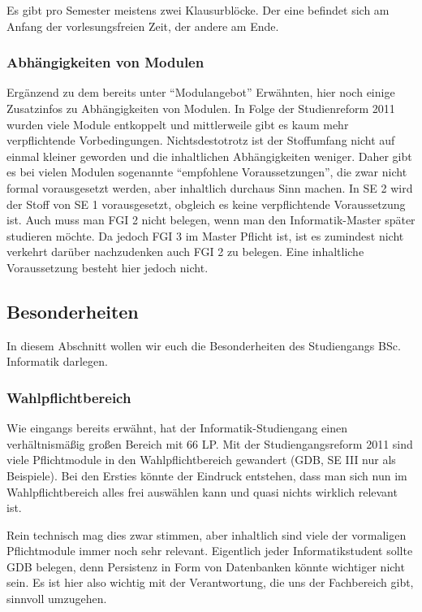 \documentclass[a4paper,11pt]{scrartcl} %
\begin{document}
		Es gibt pro Semester meistens zwei Klausurblöcke. Der eine befindet sich am Anfang der vorlesungsfreien Zeit, der andere am Ende.
		
		\subsubsection*{Abhängigkeiten von Modulen}
		
		Ergänzend zu dem bereits unter "`Modulangebot"' Erwähnten, hier noch einige Zusatzinfos zu Abhängigkeiten von Modulen. In Folge der Studienreform 2011 wurden viele Module entkoppelt und mittlerweile gibt es kaum mehr verpflichtende Vorbedingungen. Nichtsdestotrotz ist der Stoffumfang nicht auf einmal kleiner geworden und die inhaltlichen Abhängigkeiten weniger. Daher gibt es bei vielen Modulen sogenannte "`empfohlene Voraussetzungen"', die zwar nicht formal vorausgesetzt werden, aber inhaltlich durchaus Sinn machen. In SE 2 wird der Stoff von SE 1 vorausgesetzt, obgleich es keine verpflichtende Voraussetzung ist. Auch muss man FGI 2 nicht belegen, wenn man den Informatik-Master später studieren möchte. Da jedoch FGI 3 im Master Pflicht ist, ist es zumindest nicht verkehrt darüber nachzudenken auch FGI 2 zu belegen. Eine inhaltliche Voraussetzung besteht hier jedoch nicht.

    \subsection{Besonderheiten} %

In diesem Abschnitt wollen wir euch die Besonderheiten des Studiengangs BSc. Informatik darlegen.
	
		\subsubsection*{Wahlpflichtbereich}

Wie eingangs bereits erwähnt, hat der Informatik-Studiengang einen verhältnismäßig großen Bereich mit 66 LP. Mit der Studiengangsreform 2011 sind viele Pflichtmodule in den Wahlpflichtbereich gewandert (GDB, SE III nur als Beispiele). Bei den Ersties könnte der Eindruck entstehen, dass man sich nun im Wahlpflichtbereich alles frei auswählen kann und quasi nichts wirklich relevant ist.

Rein technisch mag dies zwar stimmen, aber inhaltlich sind viele der vormaligen Pflichtmodule immer noch sehr relevant. Eigentlich jeder Informatikstudent sollte GDB belegen, denn Persistenz in Form von Datenbanken könnte wichtiger nicht sein. Es ist hier also wichtig mit der Verantwortung, die uns der Fachbereich gibt, sinnvoll umzugehen.
\end{document}
